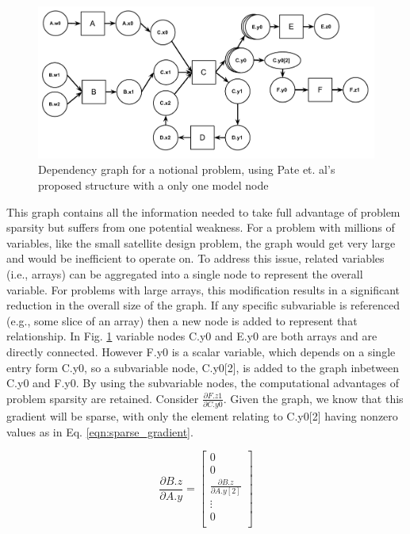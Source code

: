 \documentclass[]{aiaa-tc} %
\begin{document}
    \begin{figure}[!htb]\begin{center}
      \includegraphics[width=.8\textwidth]{images/sample_graph}
      \caption{Dependency graph for a notional problem, using Pate et. al's proposed structure with a only one model node \label{fig:sample_graph}}
    \end{center}\end{figure}


    This graph contains all the information needed to take full advantage of problem sparsity but suffers from one potential
    weakness. For a problem with millions of  variables, like the small satellite design problem,
    the graph would get very large and would be inefficient to operate on. To address this issue,
    related variables (i.e., arrays) can be aggregated into a single node to represent the
    overall variable. For problems with large arrays, this modification results in a significant reduction
    in the overall size of the graph. If any specific subvariable is referenced (e.g., some slice of an array)
    then a new node is added to represent that relationship. In Fig. \ref{fig:sample_graph} variable nodes C.y0 and E.y0 are both 
    arrays and are directly connected. However F.y0 is a scalar variable, which depends on a single entry form C.y0, 
    so a subvariable node, C.y0[2], is added to the graph inbetween C.y0 and F.y0. 
    By using the subvariable nodes, the computational advantages of problem sparsity are retained. Consider 
    $\frac{\partial F.z1}{\partial C.y0}$. Given the graph, we know that
    this gradient will be sparse, with only the element relating to C.y0[2] having nonzero values as in Eq. \ref{eqn:sparse_gradient}.

    \begin{equation}
        \frac{\partial B.z}{\partial A.y} =
        \begin{bmatrix}
            0 \\
            0 \\
            \frac{\partial B.z}{\partial A.y[2]} \\
            \vdots \\
            0 \\
        \end{bmatrix}
        \label{eqn:sparse_gradient}
    \end{equation}
\end{document}
